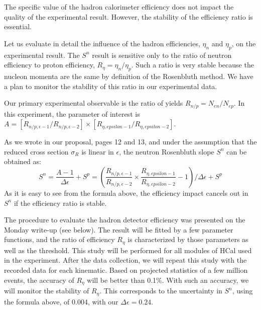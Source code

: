 The specific value of the hadron calorimeter efficiency does not impact the quality of the experimental result.
However, the stability of the efficiency ratio is essential.

Let us evaluate in detail the influence of the hadron efficiencies, $\eta_n$ and $\eta_p$, on the experimental result.
The $S^n$ result is sensitive only to the ratio of neutron efficiency to proton efficiency, $R_{\eta} = \eta_n/\eta_p$.
Such a ratio is very stable because the nucleon momenta are the same by definition of the Rosenbluth method.   
We have a plan to monitor the stability of this ratio in our experimental data.

Our primary experimental observable is the ratio of yields $R_{n/p} = N_{en}/N_{ep}$.
In this experiment, the parameter of interest is $A = [R_{n/p, \epsilon-1}/R_{n/p, \epsilon-2}]\times[R_{\eta, epsilon-1}/R_{\eta, epsilon-2}]$.

As we wrote in our proposal, pages 12 and 13, and under the assumption that the reduced cross section $\sigma_R$ is linear in $\epsilon$,
the neutron Rosenbluth slope $S^n$ can be obtained as:
%
\begin{equation}
  S^n = \frac{A-1}{\Delta\epsilon} + S^p = (\frac{R_{n/p, \epsilon-1}}{R_{n/p, \epsilon-2}}\times \frac{R_{\eta, epsilon-1}}{R_{\eta, epsilon-2}}-1)/\Delta\epsilon + S^p
  \label{eq:Sn}
\end{equation}
%
As it is easy to see from the formula above, the efficiency impact cancels out in $S^n$ if the efficiency ratio is stable.

The procedure to evaluate the hadron detector efficiency was presented on the Monday write-up (see below).
The result will be fitted by a few parameter functions, and the ratio of efficiency $R_{\eta}$ is characterized by those parameters as well as the threshold.
This study will be performed for all modules of HCal used in the experiment.
After the data collection, we will repeat this study with the recorded data for each kinematic.
Based on projected statistics of a few million events, the accuracy of $R_{\eta}$ will be better than 0.1\%.
With such an accuracy, we will monitor the stability of $R_{\eta}$.
This corresponds to the uncertainty in $S^n$, using the formula above, of 0.004, with our $\Delta \epsilon = 0.24$. 

